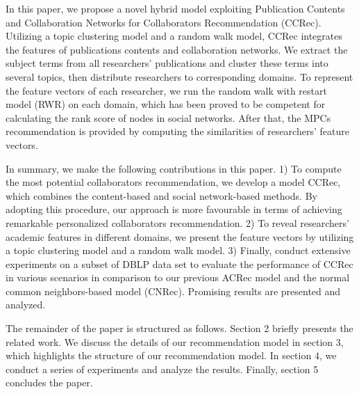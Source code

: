 \documentclass[review]{elsarticle}
\begin{document}
In this paper, we propose a novel hybrid model exploiting Publication Contents and Collaboration Networks for Collaborators Recommendation (CCRec). Utilizing a topic clustering model \cite{pan2010research} \cite{pham2011clustering} and a random walk model, CCRec integrates the features of publications contents and collaboration networks. We extract the subject terms from all researchers' publications and cluster these terms into several topics, then distribute researchers to corresponding domains. To represent the feature vectors of each researcher, we run the random walk with restart model (RWR) on each domain, which has been proved to be competent for calculating the rank score of nodes in social networks. After that, the MPCs recommendation is provided by computing the similarities of researchers' feature vectors.

In summary, we make the following contributions in this paper. 1) To compute the most potential collaborators recommendation, we develop a model CCRec, which combines the content-based and social network-based methods. By adopting this procedure, our approach is more favourable in terms of achieving remarkable personalized collaborators recommendation. 2) To reveal researchers' academic features in different domains, we present the feature vectors by utilizing a topic clustering model and a random walk model. 3) Finally, conduct extensive experiments on a subset of DBLP data set to evaluate the performance of CCRec in various scenarios in comparison to our previous ACRec model and the normal common neighbors-based model (CNRec). Promising results are presented and analyzed.

The remainder of the paper is structured as follows. Section 2 briefly presents the related work. We discuss the details of our recommendation model in section 3, which highlights the structure of our recommendation model. In section 4, we conduct a series of experiments and analyze the results. Finally, section 5 concludes the paper.

\end{document}
